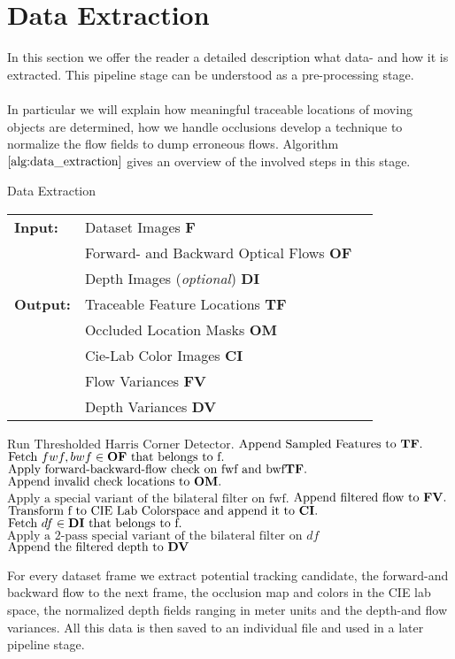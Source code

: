 \section{Data Extraction}
\label{sec:data_extraction}
In this section we offer the reader a detailed description what data- and how it is extracted. This pipeline stage can be understood as a pre-processing stage. \\ \\
In particular we will explain how meaningful traceable locations of moving objects are determined, how we handle occlusions develop a technique to normalize the flow fields to dump erroneous flows. Algorithm $\ref{alg:data_extraction}$ gives an overview of the involved steps in this stage.
\begin{algorithm}[H]
\caption{Data Extraction}
\begin{table}[H]
  \begin{tabular}{@{}lll@{}}
    \textbf{Input:} & Dataset Images \bf{F} \\
		& Forward- and Backward Optical Flows \bf{OF} \\
 		& Depth Images (\emph{optional}) \bf{DI} \\
    \textbf{Output:} & Traceable Feature Locations \bf{TF} \\
    & Occluded Location Masks \bf{OM}\\
    & Cie-Lab Color Images \bf{CI} \\
    & Flow Variances \bf{FV} \\
    & Depth Variances \bf{DV} \\
    
  \end{tabular} 
\end{table}
\setlength{\fboxrule}{0pt} 
\begin{boxedminipage}{1.0\textwidth}
  \begin{algorithmic}[1]
        \State $\text{Run Thresholded Harris Corner Detector}.$
		\State $\text{Append Sampled Features to } \bf{TF}.$
		\State $\text{Fetch } fwf,bwf \in \bf{OF} \text{ that belongs to f}.$
		\State $\text{Apply forward-backward-flow check on fwf and bwf} \bf{TF}.$
		\State $\text{Append invalid check locations to } \bf{OM}.$
		\State $\text{Apply a special variant of the bilateral filter on fwf}.$
		\State $\text{Append filtered flow to } \bf{FV}.$
		\State $\text{Transform f to CIE Lab Colorspace and append it to } \bf{CI}.$
		\State $\text{Fetch } df \in \bf{DI} \text{ that belongs to f}.$
		\State $\text{Apply a 2-pass special variant of the bilateral filter on } df$
		\State $\text{Append the filtered depth to } \bf{DV}$
      \EndFor
  \end{algorithmic}
  \end{boxedminipage}
  \vskip1.5pt
\label{alg:data_extraction}
\end{algorithm}
For every dataset frame we extract potential tracking candidate, the forward-and backward flow to the next frame, the occlusion map and colors in the CIE lab space, the normalized depth fields ranging in meter units and the depth-and flow variances. All this data is then saved to an individual file and used in a later pipeline stage.
